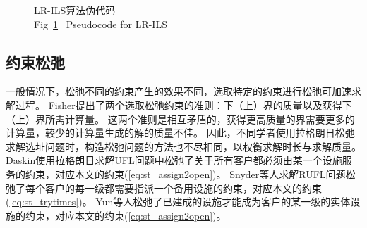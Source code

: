 \begin{figure}[!ht]
    \centering
    \setlength{\belowcaptionskip}{-0.5cm} 
\caption{LR-ILS算法伪代码\\
    Fig~\ref{fig:lr_pseudo}~ Pseudocode for LR-ILS}
\label{fig:lr_pseudo}
\end{figure}



\subsection{约束松弛}
\label{subsec:约束松弛}
一般情况下，松弛不同的约束产生的效果不同，选取特定的约束进行松弛可加速求解过程。
Fisher\cite{Fisher2004}提出了两个选取松弛约束的准则：下（上）界的质量以及获得下（上）界所需计算量。
这两个准则是相互矛盾的，获得更高质量的界需要更多的计算量，较少的计算量生成的解的质量不佳。
因此，不同学者使用拉格朗日松弛求解选址问题时，构造松弛问题的方法也不尽相同，以权衡求解时长与求解质量。
Daskin\cite{Daskin书}使用拉格朗日求解UFL问题中松弛了关于所有客户都必须由某一个设施服务的约束，对应本文的约束(\ref{eq:st_assign2open})。
Snyder等人\cite{Snyder2005}求解RUFL问题松弛了每个客户的每一级都需要指派一个备用设施的约束，对应本文的约束(\ref{eq:st_trytimes})。
Yun等人\cite{YUN2020}松弛了已建成的设施才能成为客户的某一级的实体设施的约束，对应本文的约束(\ref{eq:st_assign2open})。

